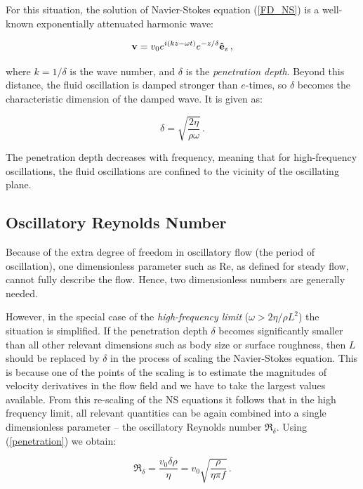 \newpage

For this situation, the solution of Navier-Stokes equation (\ref{FD_NS}) is a well-known exponentially attenuated harmonic wave:

\begin{equation}
\mathbf{v} = v_0 e^{i(kz - \omega t)} e^{-z/\delta} \mathbf{\hat{e}}_{\mathrm{z}}\,,
\label{v_pen}
\end{equation}

where $k = 1/\delta$ is the wave number, and $\delta$ is the \textit{penetration depth}. Beyond this distance, the fluid oscillation is damped stronger than $e$-times, so $ \delta $ becomes the characteristic dimension of the damped wave. It is given as\cite{landau}:

\begin{equation}
\delta = \sqrt{\frac{2\eta}{\rho \omega}}\,.
\label{penetration}
\end{equation}

The penetration depth decreases with frequency, meaning that for high-frequency oscillations, the fluid oscillations are confined to the vicinity of the oscillating plane.

\subsection*{Oscillatory Reynolds Number}

Because of the extra degree of freedom in oscillatory flow (the period of oscillation), one dimensionless parameter such as Re, as defined for steady flow, cannot fully describe the flow. Hence, two dimensionless numbers are generally needed.

However, in the special case of the \textit{high-frequency limit} ($ \omega > 2\eta / \rho L^2  $) the situation is simplified. If the penetration depth $ \delta $ becomes significantly smaller than all other relevant dimensions such as body size or surface roughness, then $ L $ should be replaced by $ \delta $ in the process of scaling the Navier-Stokes equation. This is because one of the points of the scaling is to estimate the magnitudes of velocity derivatives in the flow field and we have to take the largest values available. From this re-scaling of the NS equations it follows that in the high frequency limit, all relevant quantities can be again combined into a single dimensionless parameter -- the oscillatory Reynolds number $ \Re_{\delta} $. Using (\ref{penetration}) we obtain:

\begin{equation}
\Re_{\delta} = \frac{v_0 \delta\rho}{\eta}
= v_0 \sqrt{\frac{\rho}{\eta \pi f}} \,.
\label{Re*}
\end{equation}

